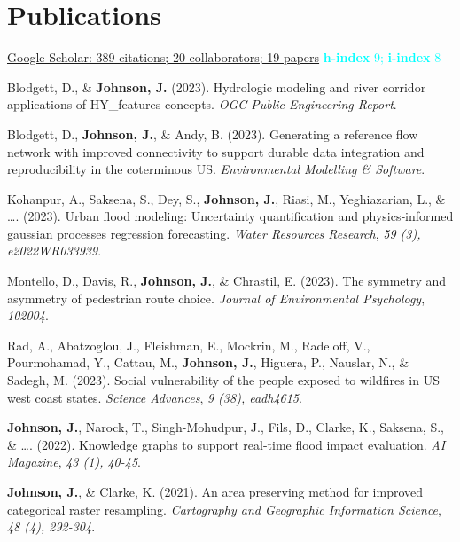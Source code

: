 \documentclass[11pt,a4paper,]{awesome-cv}
\begin{document}
\hypertarget{publications}{%
\section{Publications}\label{publications}}

\textcolor{cyan}{ \href{https://tinyurl.com/mike-google-scholar}{ Google Scholar: 389 citations;  20 collaborators;  19 papers} \newline
\textbf{h-index} 9; \textbf{i-index} 8}

\hypertarget{bibliography}{}
\leavevmode{}%
Blodgett, D., \& \textbf{Johnson, J.} (2023). Hydrologic modeling and
river corridor applications of HY\_features concepts. \emph{OGC Public
Engineering Report}.

\leavevmode{}%
Blodgett, D., \textbf{Johnson, J.}, \& Andy, B. (2023). Generating a
reference flow network with improved connectivity to support durable
data integration and reproducibility in the coterminous US.
\emph{Environmental Modelling \& Software}.

\leavevmode{}%
Kohanpur, A., Saksena, S., Dey, S., \textbf{Johnson, J.}, Riasi, M.,
Yeghiazarian, L., \& \ldots. (2023). Urban flood modeling: Uncertainty
quantification and physics‐informed gaussian processes regression
forecasting. \emph{Water Resources Research}, \emph{59 (3),
e2022WR033939}.

\leavevmode{}%
Montello, D., Davis, R., \textbf{Johnson, J.}, \& Chrastil, E. (2023).
The symmetry and asymmetry of pedestrian route choice. \emph{Journal of
Environmental Psychology}, \emph{102004}.

\leavevmode{}%
Rad, A., Abatzoglou, J., Fleishman, E., Mockrin, M., Radeloff, V.,
Pourmohamad, Y., Cattau, M., \textbf{Johnson, J.}, Higuera, P., Nauslar,
N., \& Sadegh, M. (2023). Social vulnerability of the people exposed to
wildfires in US west coast states. \emph{Science Advances}, \emph{9
(38), eadh4615}.

\leavevmode{}%
\textbf{Johnson, J.}, Narock, T., Singh-Mohudpur, J., Fils, D., Clarke,
K., Saksena, S., \& \ldots. (2022). Knowledge graphs to support
real-time flood impact evaluation. \emph{AI Magazine}, \emph{43 (1),
40-45}.

\leavevmode{}%
\textbf{Johnson, J.}, \& Clarke, K. (2021). An area preserving method
for improved categorical raster resampling. \emph{Cartography and
Geographic Information Science}, \emph{48 (4), 292-304}.
\end{document}

